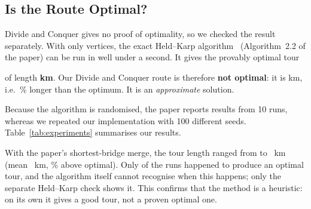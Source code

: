 \subsection{Is the Route Optimal?}\label{sec:optimality}
Divide and Conquer gives no proof of optimality, so we checked the result separately. With only
\NumVertices{} vertices, the exact Held--Karp algorithm~\cite{heldkarp1962} (Algorithm~2.2 of the
paper) can be run in well under a second. It gives the provably optimal tour
\begin{center}
\OptRoute{}
\end{center}
of length \textbf{\OptTotal{} km}. Our Divide and Conquer route is therefore \textbf{not optimal}: it is
\DCTotal{} km, i.e.\ \DCGap\% longer than the optimum. It is an \emph{approximate} solution.

Because the algorithm is randomised, the paper reports results from 10 runs, whereas we repeated our
implementation with 100 different seeds. Table~\ref{tab:experiments} summarises our results.

\begin{table}[H]
\centering
\caption{Tour length (km) over \RunCount{} seeds, compared with the exact optimum. ``Optimal'' counts the runs
that reached the optimum.}\label{tab:experiments}
\vspace{4pt}
\small

\end{table}

With the paper's shortest-bridge merge, the tour length ranged from \BridgeBest{} to \BridgeWorst{}~km
(mean \BridgeMean{}~km, \BridgeMeanGap\% above optimal). Only \BridgeOptHits{} of the \RunCount{} runs
happened to produce an optimal tour, and the algorithm itself cannot recognise when this happens; only
the separate Held--Karp check shows it. This confirms that the method is a heuristic: on its own it
gives a good tour, not a proven optimal one.
